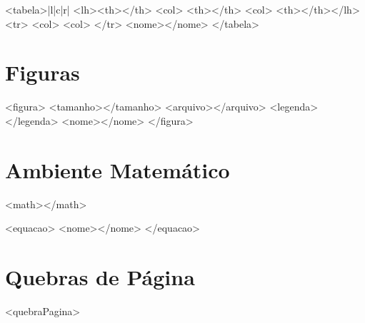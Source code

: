 \begin{BoxVerbatim}
<tabela>{|l|c|r|}
    <lh><th></th> <col> <th></th> <col> <th></th></lh>
    <tr> <col> <col> </tr>
    <nome></nome>
</tabela>
\end{BoxVerbatim}

\section{Figuras}\setcounter{SteP}{1}

\begin{BoxVerbatim}
<figura>
    <tamanho></tamanho>
    <arquivo></arquivo>
    <legenda></legenda>
    <nome></nome>
</figura>
\end{BoxVerbatim}

\section{Ambiente Matemático}\setcounter{SteP}{1}

\begin{BoxVerbatim}
<math></math>

<equacao>
    <nome></nome>
</equacao>
\end{BoxVerbatim}

\section{Quebras de Página}\setcounter{SteP}{1}

\begin{BoxVerbatim}
<quebraPagina>
\end{BoxVerbatim}

